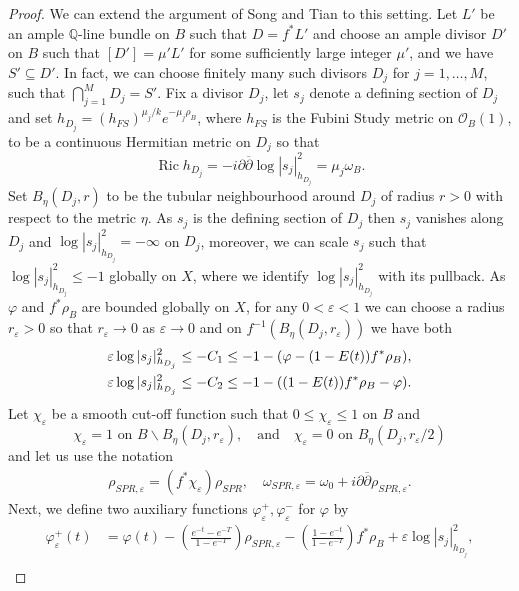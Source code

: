 \documentclass[12pt]{article}
\numberwithin{equation}{section}
\newcommand{\Q}{\mathbb{Q}}
\newcommand{\OO}{\mathcal{O}}
\renewcommand{\d}{\partial}
\newcommand{\dbar}{\overline{\partial}}
\newcommand{\e}{\varepsilon}
\DeclareMathOperator{\Ric}{Ric}
\begin{document}
\begin{proof}
We can extend the argument \cite[Thm 5.1, Prop 5.4]{ST12} of Song and Tian to this setting. Let $L'$ be an ample $\Q$-line bundle on $B$ such that $D = f^*L'$ and choose an ample divisor $D'$ on $B$ such that $[D'] = \mu'L'$ for some sufficiently large integer $\mu'$, and we have $S' \subseteq D'$. In fact, we can choose finitely many such divisors $D_j$ for $j = 1, \dots, M$, such that $\bigcap_{j = 1}^M D_j = S'$. Fix a divisor $D_j$, let $s_j$ denote a defining section of $D_j$ and set $h_{D_j} = (h_{FS})^{\mu_j/k} e^{-\mu_j\rho_B}$, where $h_{FS}$ is the Fubini Study metric on $\OO_B(1)$, to be a continuous Hermitian metric on $D_j$ so that
\begin{equation*}
    \Ric h_{D_j} = -i\d\dbar \log |s_j|^2_{h_{D_j}} = \mu_j\omega_B.
\end{equation*}
Set $B_{\eta}(D_j,r)$ to be the tubular neighbourhood around $D_j$ of radius $r > 0$ with respect to the metric $\eta$. As $s_j$ is the defining section of $D_j$ then $s_j$ vanishes along $D_j$ and $\log|s_j|_{h_{D_j}}^2 = -\infty$ on $D_j$, moreover, we can scale $s_j$ such that $\log |s_j|_{h_{D_j}}^2 \leq -1$ globally on $X$, where we identify $\log |s_j|_{h_{D_j}}^2$ with its pullback. As $\varphi$ and $f^*\rho_B$ are bounded globally on $X$, for any $0 < \e < 1$ we can choose a radius $r_\e > 0$ so that $r_\e \to 0$ as $\e \to 0$ and on $f^{-1}(B_{\eta}(D_j,r_\e))$ we have both
\begin{align}\label{tubular_nbhd_bound}
    \e \log |s_j|_{h_{D_j}}^2 &\leq -C_1 \leq -1 - (\varphi - (1-E(t))f^* \rho_B),\\
    \e \log |s_j|_{h_{D_j}}^2 &\leq -C_2 \leq -1 - ((1-E(t))f^* \rho_B - \varphi).\notag
\end{align}
Let $\chi_\e$ be a smooth cut-off function such that $0 \leq \chi_\e \leq 1$ on $B$ and
\begin{equation*}
\chi_\e = 1 \text{ on } B \backslash B_{\eta}(D_j,r_\e), \quad \text{and} \quad \chi_\e = 0 \text{ on } B_{\eta}(D_j,r_\e/2)
\end{equation*}
and let us use the notation
\begin{align*}
    \rho_{SPR,\e} = (f^*\chi_{\e}) \rho_{SPR}, \quad
    \omega_{SPR,\e} = \omega_0 + i\d\dbar \rho_{SPR,\e}.
\end{align*}
Next, we define two auxiliary functions $\varphi^{+}_{\e}, \varphi^{-}_{\e}$ for $\varphi$ by
\begin{align*}
    \varphi_{\e}^{+}(t) &= \varphi(t) - \left(\frac{e^{-t}-e^{-T}}{1-e^{-T}}\right) \rho_{SPR,\e} - \left(\frac{1-e^{-t}}{1-e^{-T}}\right) f^*\rho_{B} + \e \log|s_j|_{h_{D_j}}^2,\\

\end{align*}
\end{proof}
\end{document}
